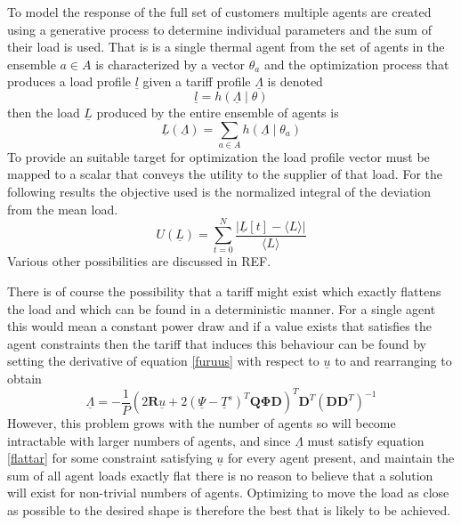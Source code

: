 \documentclass[a4paper, 10 pt, conference]{ieeeconf}  %
\begin{document}
To model the response of the full set of customers multiple agents are created using a generative process to determine individual parameters and the sum of their load is used. That is is a single thermal agent from the set of agents in the ensemble $a \in A$ is characterized by a vector $\theta_{a}$ and the optimization process that produces a load profile $\underline{l}$ given a tariff profile $\underline{\Lambda}$ is denoted
\begin{equation}
\underline{l}=h(\underline{\Lambda} \mid \theta)
\end{equation}
then the load $\underline{L}$ produced by the entire ensemble of agents is
\begin{equation}
\underline{L}(\underline{\Lambda}) = \sum_{a \in A} h(\underline{\Lambda} \mid \theta_{a})
\end{equation}
To provide an suitable target for optimization the load profile vector must be mapped to a scalar that conveys the utility to the supplier of that load. For the following results the objective used is the normalized integral of the deviation from the mean load.
\begin{equation}
U(\underline{L})=\sum_{t=0}^{N} \frac{\left| \underline{L}[t]-\langle L \rangle \right|}{\langle L \rangle}
\end{equation}
Various other possibilities are discussed in REF.

There is of course the possibility that a tariff might exist which exactly flattens the load and which can be found in a deterministic manner. For a single agent this would mean a constant power draw and if a value exists that satisfies the agent constraints then the tariff that induces this behaviour can be found by setting the derivative of equation \ref{furuus} with respect to $\underline{u}$ to and rearranging to obtain
\begin{equation}
\label{flattar}
\underline{\Lambda} = -\frac{1}{P}\left( 2\mathbf{R}\underline{u} + 2(\underline{\Psi}-\underline{T}^s)^{T}\mathbf{Q}\boldsymbol{\Phi}\mathbf{D}\right)^{T}\mathbf{D}^T(\mathbf{DD}^{T})^{-1}
\end{equation}
However, this problem grows with the number of agents so will become intractable with larger numbers of agents, and since $\underline{\Lambda}$ must satisfy equation \ref{flattar} for some constraint satisfying $\underline{u}$ for every agent present, and maintain the sum of all agent loads exactly flat there is no reason to believe that a solution will exist for non-trivial numbers of agents. Optimizing to move the load as close as possible to the desired shape is therefore the best that is likely to be achieved.
\end{document}

